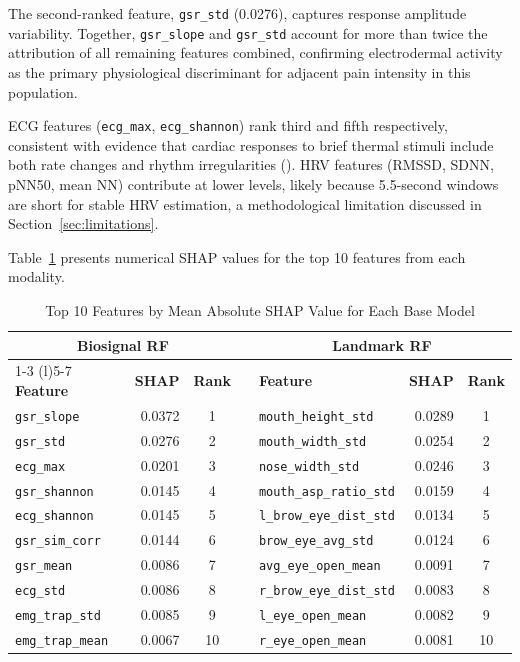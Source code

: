 \documentclass[10pt, twocolumn]{article}
\begin{document}
The second-ranked feature, \texttt{gsr\_std} (0.0276), captures response amplitude
variability. Together, \texttt{gsr\_slope} and \texttt{gsr\_std} account for more than
twice the attribution of all remaining features combined, confirming electrodermal activity
as the primary physiological discriminant for adjacent pain intensity in this population.

ECG features (\texttt{ecg\_max}, \texttt{ecg\_shannon}) rank third and fifth respectively,
consistent with evidence that cardiac responses to brief thermal stimuli include both rate
changes and rhythm irregularities (\cite{Edwards2009}). HRV features (RMSSD, SDNN, pNN50,
mean NN) contribute at lower levels, likely because 5.5-second windows are short for
stable HRV estimation, a methodological limitation discussed in
Section~\ref{sec:limitations}.

Table~\ref{tab:shap} presents numerical SHAP values for the top 10 features from each
modality.

\begin{table}[t]
\centering
\caption{Top 10 Features by Mean Absolute SHAP Value for Each Base Model}
\label{tab:shap}
\small
\begin{tabular}{lrcclrc}
\toprule
\multicolumn{3}{c}{\textbf{Biosignal RF}} & \quad &
\multicolumn{3}{c}{\textbf{Landmark RF}} \\
\cmidrule(r){1-3} \cmidrule(l){5-7}
\textbf{Feature} & \textbf{SHAP} & \textbf{Rank} & &
\textbf{Feature} & \textbf{SHAP} & \textbf{Rank} \\
\midrule
\texttt{gsr\_slope}       & 0.0372 & 1 & & \texttt{mouth\_height\_std}     & 0.0289 & 1 \\
\texttt{gsr\_std}         & 0.0276 & 2 & & \texttt{mouth\_width\_std}      & 0.0254 & 2 \\
\texttt{ecg\_max}         & 0.0201 & 3 & & \texttt{nose\_width\_std}       & 0.0246 & 3 \\
\texttt{gsr\_shannon}     & 0.0145 & 4 & & \texttt{mouth\_asp\_ratio\_std} & 0.0159 & 4 \\
\texttt{ecg\_shannon}     & 0.0145 & 5 & & \texttt{l\_brow\_eye\_dist\_std}& 0.0134 & 5 \\
\texttt{gsr\_sim\_corr}   & 0.0144 & 6 & & \texttt{brow\_eye\_avg\_std}    & 0.0124 & 6 \\
\texttt{gsr\_mean}        & 0.0086 & 7 & & \texttt{avg\_eye\_open\_mean}   & 0.0091 & 7 \\
\texttt{ecg\_std}         & 0.0086 & 8 & & \texttt{r\_brow\_eye\_dist\_std}& 0.0083 & 8 \\
\texttt{emg\_trap\_std}   & 0.0085 & 9 & & \texttt{l\_eye\_open\_mean}     & 0.0082 & 9 \\
\texttt{emg\_trap\_mean}  & 0.0067 & 10& & \texttt{r\_eye\_open\_mean}     & 0.0081 & 10\\
\bottomrule
\end{tabular}
\end{table}
\end{document}
